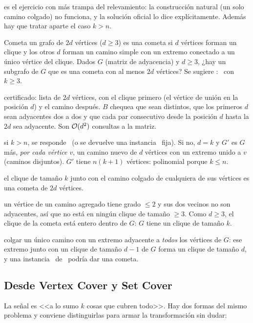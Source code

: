  es el ejercicio con más trampa del relevamiento: la construcción natural (un solo camino colgado) no funciona, y la solución oficial lo dice explícitamente. Además hay que tratar aparte el caso $k>n$.

\begin{problema}{Cometa}
 un grafo de $2d$ vértices ($d\ge3$) es una cometa si $d$ vértices forman un clique y los otros $d$ forman un camino simple con un extremo conectado a un único vértice del clique. Dados $G$ (matriz de adyacencia) y $d\ge 3$, ¿hay un subgrafo de $G$ que es una cometa con al menos $2d$ vértices? Se sugiere : \npCL\ con $k\ge 3$.

 certificado: lista de $2d$ vértices, con el clique primero (el vértice de unión en la posición $d$) y el camino después. $B$ chequea que sean distintos, que los primeros $d$ sean adyacentes dos a dos y que cada par consecutivo desde la posición $d$ hasta la $2d$ sea adyacente. Son $\mathcal{O}(d^2)$ consultas a la matriz.

 si $k>n$, se responde \npno\ (o se devuelve una instancia \npno\ fija). Si no, $d=k$ y $G'$ es $G$ más, \emph{por cada vértice $v$}, un camino nuevo de $d$ vértices con un extremo unido a $v$ (caminos disjuntos). $G'$ tiene $n(k+1)$ vértices: polinomial porque $k\le n$.

 el clique de tamaño $k$ junto con el camino colgado de cualquiera de sus vértices es una cometa de $2d$ vértices.

 un vértice de un camino agregado tiene grado $\le 2$ y sus dos vecinos no son adyacentes, así que no está en ningún clique de tamaño $\ge3$. Como $d\ge3$, el clique de la cometa está entero dentro de $G$: $G$ tiene un clique de tamaño $k$.

 colgar un único camino con un extremo adyacente a \emph{todos} los vértices de $G$: ese extremo junto con un clique de tamaño $d-1$ de $G$ forma un clique de tamaño $d$, y una instancia \npno\ de \npCL\ podría dar una cometa.
\end{problema}

\subsection{Desde Vertex Cover y Set Cover}

La señal es <<a lo sumo $k$ cosas que cubren todo>>. Hay dos formas del mismo problema y conviene distinguirlas para armar la transformación sin dudar:

